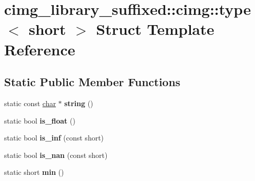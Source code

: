 \hypertarget{structcimg__library__suffixed_1_1cimg_1_1type_3_01short_01_4}{}\section{cimg\+\_\+library\+\_\+suffixed\+:\+:cimg\+:\+:type$<$ short $>$ Struct Template Reference}
\label{structcimg__library__suffixed_1_1cimg_1_1type_3_01short_01_4}
\subsection*{Static Public Member Functions}
\begin{DoxyCompactItemize}
\item 
\mbox{\label{structcimg__library__suffixed_1_1cimg_1_1type_3_01short_01_4_a868ffb1ab9bc0053bd6db714ff09f444}} 
static const \hyperlink{classchar}{char} $\ast$ {\bfseries string} ()
\item 
\mbox{\label{structcimg__library__suffixed_1_1cimg_1_1type_3_01short_01_4_a4dc02ea2433c37b2790e75272fdfcfaa}} 
static bool {\bfseries is\+\_\+float} ()
\item 
\mbox{\label{structcimg__library__suffixed_1_1cimg_1_1type_3_01short_01_4_a490b7ab4aa0a44befefbe85e0725d323}} 
static bool {\bfseries is\+\_\+inf} (const short)
\item 
\mbox{\label{structcimg__library__suffixed_1_1cimg_1_1type_3_01short_01_4_ad95519af1cc8f18d5eb2a4d99e15588c}} 
static bool {\bfseries is\+\_\+nan} (const short)
\item 
\mbox{\label{structcimg__library__suffixed_1_1cimg_1_1type_3_01short_01_4_ad2418047e034e2914b905c11ea3328c8}} 
static short {\bfseries min} ()
\item 
\mbox{\label{structcimg__library__suffixed_1_1cimg_1_1type_3_01short_01_4_a1d4d6cbe40d0e49b29519e03ceb97a54}} 

\end{DoxyCompactItemize}
